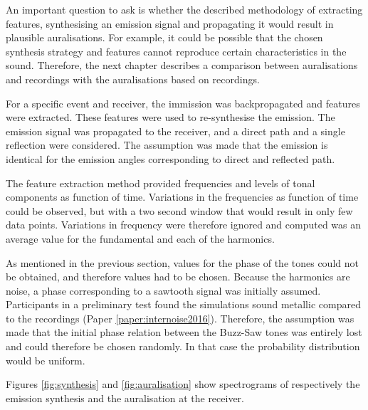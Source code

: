 An important question to ask is whether the described methodology of extracting
features, synthesising an emission signal and propagating it would result in
plausible auralisations. For example, it could be possible that the chosen
synthesis strategy and features cannot reproduce certain characteristics in the
sound. Therefore, the next chapter describes a comparison between auralisations
and recordings with the auralisations based on recordings.

For a specific event and receiver, the immission was backpropagated and features
were extracted. These features were used to re-synthesise the emission. The
emission signal was propagated to the receiver, and a direct path and a single
reflection were considered. The assumption was made that the emission is
identical for the emission angles corresponding to direct and reflected path.

The feature extraction method provided frequencies and levels of tonal
components as function of time. Variations in the frequencies as function of
time could be observed, but with a two second window that would result in only
few data points. Variations in frequency were therefore ignored and computed was an
average value for the fundamental and each of the harmonics.

As mentioned in the previous section, values for the phase of the tones could
not be obtained, and therefore values had to be chosen. Because the harmonics
are  noise, a phase corresponding to a sawtooth signal was
initially assumed. Participants in a preliminary test found the simulations
sound metallic compared to the recordings (Paper \ref{paper:internoise2016}). Therefore, the
assumption was made that the initial phase relation between the Buzz-Saw tones
was entirely lost and could therefore be chosen randomly. In that case the
probability distribution would be uniform.

Figures \ref{fig:synthesis} and \ref{fig:auralisation} show spectrograms of
respectively the emission synthesis and the auralisation at the receiver.

\newpage
{}


